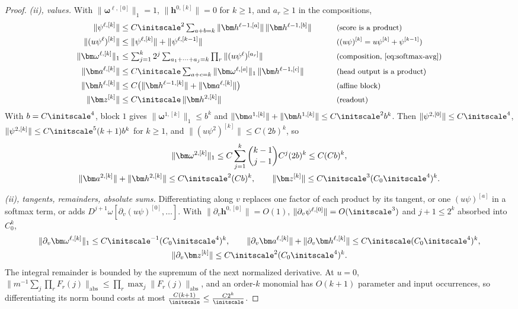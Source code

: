 \begin{proof}
\emph{(ii), values.} With $\|\bm\omega^{\ell,[0]}\|_1=1$, $\|\bm h^{0,[k]}\|=0$ for $k\ge1$, and $a_r\ge1$ in the compositions,
\begin{alignat*}{2}
 \|\psi^{\ell,[k]}\|&\le C\initscale^2\textstyle\sum_{a+b=k}\|\bm h^{\ell-1,[a]}\|\,\|\bm h^{\ell-1,[b]}\| &\qquad& \why{score is a product}\\
 \|(u\psi^\ell)^{[k]}\|&\le\|\psi^{\ell,[k]}\|+\|\psi^{\ell,[k-1]}\| && \why{$(u\psi)^{[k]}=u\psi^{[k]}+\psi^{[k-1]}$}\\
 \|\bm\omega^{\ell,[k]}\|_1&\le\textstyle\sum_{j=1}^k2^j\sum_{a_1+\cdots+a_j=k}\prod_r\|(u\psi^\ell)^{[a_r]}\| && \why{composition, \cref{eq:softmax-avg}}\\
 \|\bm a^{\ell,[k]}\|&\le C\initscale\textstyle\sum_{a+c=k}\|\bm\omega^{\ell,[a]}\|_1\,\|\bm h^{\ell-1,[c]}\| && \why{head output is a product}\\
 \|\bm h^{\ell,[k]}\|&\le C\bigl(\|\bm h^{\ell-1,[k]}\|+\|\bm a^{\ell,[k]}\|\bigr) && \why{affine block}\\
 \|\bm z^{[k]}\|&\le C\initscale\,\|\bm h^{2,[k]}\| && \why{readout}
\end{alignat*}
With $b=C\initscale^4$, block $1$ gives $\|\bm\omega^{1,[k]}\|_1\le b^k$ and $\|\bm a^{1,[k]}\|+\|\bm h^{1,[k]}\|\le C\initscale^2b^k$. Then $\|\psi^{2,[0]}\|\le C\initscale^4$,
$\|\psi^{2,[k]}\|\le C\initscale^5(k+1)b^k$ for $k\ge1$, and $\|(u\psi^2)^{[k]}\|\le C(2b)^k$, so
\begin{gather*}
 \|\bm\omega^{2,[k]}\|_1\le C\sum_{j=1}^k\binom{k-1}{j-1}C^j(2b)^k\le C(Cb)^k,\\
 \|\bm a^{2,[k]}\|+\|\bm h^{2,[k]}\|\le C\initscale^2(Cb)^k,\qquad \|\bm z^{[k]}\|\le C\initscale^3(C_0\initscale^4)^k .
\end{gather*}

\emph{(ii), tangents, remainders, absolute sums.} Differentiating along $v$ replaces one factor of each product by its tangent, or one
$(u\psi)^{[a]}$ in a softmax term, or adds $D^{j+1}\omega[\partial_v(u\psi)^{[0]},\ldots]$. With $\|\partial_v\bm h^{0,[0]}\|=O(1)$, $\|\partial_v\psi^{\ell,[0]}\|=O(\initscale^3)$
and $j+1\le2^k$ absorbed into $C_0^k$,
\begin{gather*}
 \|\partial_v\bm\omega^{\ell,[k]}\|_1\le C\initscale^{-1}(C_0\initscale^4)^k,\qquad \|\partial_v\bm a^{\ell,[k]}\|+\|\partial_v\bm h^{\ell,[k]}\|\le C\initscale(C_0\initscale^4)^k,\\
 \|\partial_v\bm z^{[k]}\|\le C\initscale^2(C_0\initscale^4)^k .
\end{gather*}
The integral remainder is bounded by the supremum of the next normalized derivative. At $u=0$,
$\|m^{-1}\sum_j\prod_rF_r(j)\|_{\mathrm{abs}}\le\prod_r\max_j\|F_r(j)\|_{\mathrm{abs}}$, and an order-$k$ monomial has $O(k+1)$ parameter and input
occurrences, so differentiating its norm bound costs at most $\frac{C(k+1)}{\initscale}\le \frac{C2^k}{\initscale}$.


\end{proof}
